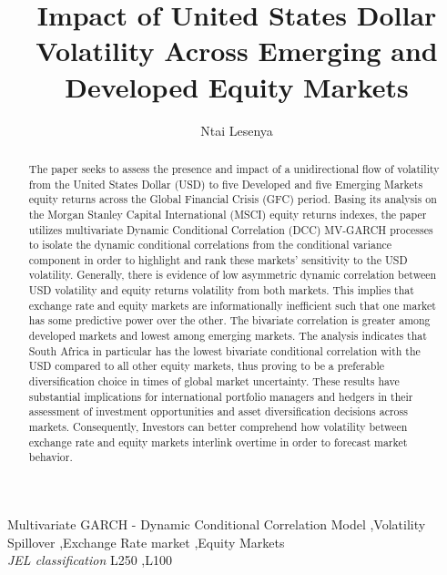 \documentclass[11pt,preprint, authoryear]{elsarticle}
\numberwithin{equation}{section}
\numberwithin{figure}{section}
\numberwithin{table}{section}
\begin{document}
\begin{frontmatter}  %

\title{Impact of United States Dollar Volatility Across Emerging and Developed
Equity Markets}





\author[Add1]{Ntai Lesenya}





\address[Add1]{22356258}
\address[Add2]{DEPARTMENT OF ECONOMICS}
\address[Add3]{STELLENBOSCH UNIVERSITY}


\begin{abstract}
\small{
The paper seeks to assess the presence and impact of a unidirectional
flow of volatility from the United States Dollar (USD) to five Developed
and five Emerging Markets equity returns across the Global Financial
Crisis (GFC) period. Basing its analysis on the Morgan Stanley Capital
International (MSCI) equity returns indexes, the paper utilizes
multivariate Dynamic Conditional Correlation (DCC) MV-GARCH processes to
isolate the dynamic conditional correlations from the conditional
variance component in order to highlight and rank these markets'
sensitivity to the USD volatility. Generally, there is evidence of low
asymmetric dynamic correlation between USD volatility and equity returns
volatility from both markets. This implies that exchange rate and equity
markets are informationally inefficient such that one market has some
predictive power over the other. The bivariate correlation is greater
among developed markets and lowest among emerging markets. The analysis
indicates that South Africa in particular has the lowest bivariate
conditional correlation with the USD compared to all other equity
markets, thus proving to be a preferable diversification choice in times
of global market uncertainty. These results have substantial
implications for international portfolio managers and hedgers in their
assessment of investment opportunities and asset diversification
decisions across markets. Consequently, Investors can better comprehend
how volatility between exchange rate and equity markets interlink
overtime in order to forecast market behavior.
}
\end{abstract}

\vspace{1cm}

\begin{keyword}
\footnotesize{
Multivariate GARCH - Dynamic Conditional Correlation Model
\sep Volatility Spillover \sep Exchange Rate market \sep Equity Markets \\ \vspace{0.3cm}
\textit{JEL classification} L250 \sep L100
}
\end{keyword}
\vspace{0.5cm}
\end{frontmatter}
\end{document}
